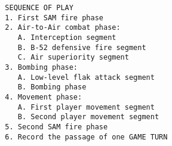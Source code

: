 \begin{verbatim}
  SEQUENCE OF PLAY
  1. First SAM fire phase
  2. Air-to-Air combat phase:
     A. Interception segment
     B. B-52 defensive fire segment
     C. Air superiority segment
  3. Bombing phase:
     A. Low-level flak attack segment
     B. Bombing phase
  4. Movement phase:
     A. First player movement segment
     B. Second player movement segment
  5. Second SAM fire phase
  6. Record the passage of one GAME TURN
  \end{verbatim}
  